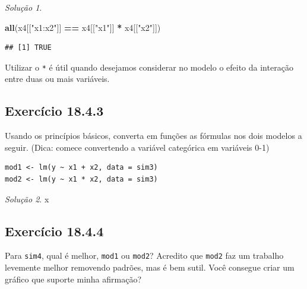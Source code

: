 \documentclass[
]{latex/krantz}
\newenvironment{Shaded}{\begin{snugshade}}{\end{snugshade}}
\newcommand{\FunctionTok}[1]{\textcolor[rgb]{0.13,0.29,0.53}{\textbf{#1}}}
\newcommand{\NormalTok}[1]{#1}
\newcommand{\SpecialCharTok}[1]{\textcolor[rgb]{0.81,0.36,0.00}{\textbf{#1}}}
\newcommand{\StringTok}[1]{\textcolor[rgb]{0.31,0.60,0.02}{#1}}
\theoremstyle{definition}
\theoremstyle{definition}
\theoremstyle{definition}
\theoremstyle{definition}
\theoremstyle{remark}
\newtheorem*{solution}{Solução}
\begin{document}
\begin{solution}
\begin{Shaded}
\begin{Highlighting}[]
\FunctionTok{all}\NormalTok{(x4[[}\StringTok{"x1:x2"}\NormalTok{]] }\SpecialCharTok{==}\NormalTok{ x4[[}\StringTok{"x1"}\NormalTok{]] }\SpecialCharTok{*}\NormalTok{ x4[[}\StringTok{"x2"}\NormalTok{]])}
\end{Highlighting}
\end{Shaded}

\begin{verbatim}
## [1] TRUE
\end{verbatim}

Utilizar o \texttt{*} é útil quando desejamos considerar no modelo o efeito da interação entre duas ou mais variáveis.
\end{solution}

\hypertarget{exr18-4-3}{%
\subsection*{Exercício 18.4.3}\label{exr18-4-3}}

Usando os princípios básicos, converta em funções as fórmulas nos dois modelos a seguir. (Dica: comece convertendo a variável categórica em variáveis 0-1)

\begin{verbatim}
mod1 <- lm(y ~ x1 + x2, data = sim3)
mod2 <- lm(y ~ x1 * x2, data = sim3)
\end{verbatim}

\begin{solution}
x
\end{solution}

\hypertarget{exr18-4-4}{%
\subsection*{Exercício 18.4.4}\label{exr18-4-4}}

Para \texttt{sim4}, qual é melhor, \texttt{mod1} ou \texttt{mod2}? Acredito que \texttt{mod2} faz um trabalho levemente melhor removendo padrões, mas é bem sutil. Você consegue criar um gráfico que suporte minha afirmação?
\end{document}
